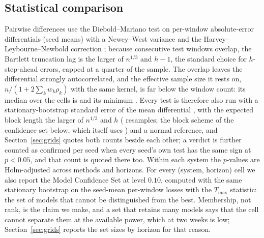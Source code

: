 \subsection{Statistical comparison}
\label{sec:stats}
Pairwise differences use the Diebold--Mariano test on per-window absolute-error differentials
(seed means) with a Newey--West variance and the Harvey--Leybourne--Newbold correction
\cite{diebold1995dm,harvey1997dm}; because consecutive test windows overlap, the Bartlett
truncation lag is the larger of $n^{1/3}$ and $h-1$, the standard choice for $h$-step-ahead
errors, capped at a quarter of the sample. The overlap leaves the differential strongly
autocorrelated, and the effective sample size it rests on, $n/(1+2\sum_k w_k\rho_k)$ with the
same kernel, is far below the window count: its median over the cells is 
and its minimum . Every test is therefore also run with a
stationary-bootstrap standard error of the mean differential \cite{politis1994stationary}, with
the expected block length the larger of $n^{1/3}$ and $h$ ( resamples; the block scheme of the confidence set below, which itself uses
) and a normal reference, and Section~\ref{sec:grids} quotes both counts beside each
other; a verdict is further counted as confirmed per seed when every seed's own test has the
same sign at $p<0.05$, and that count is quoted there too. Within each system the
$p$-values are Holm-adjusted across methods and horizons. For every (system, horizon) cell we
also report the Model Confidence Set \cite{hansen2011mcs} at level $0.10$, computed with the
same stationary bootstrap on the seed-mean per-window losses with the $T_{\max}$ statistic:
the set of models that cannot be distinguished from the best. Membership, not rank, is the
claim we make, and a set that retains many models says that the cell cannot separate them at
the available power, which at two weeks is low; Section~\ref{sec:grids} reports the set sizes by horizon for that reason.

